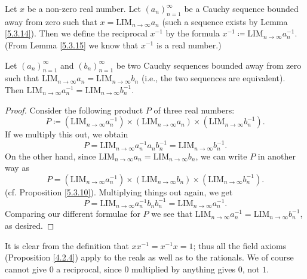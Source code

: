 \begin{definition}\label{5.3.16}
    Let \(x\) be a non-zero real number.
    Let \((a_n)_{n = 1}^{\infty}\) be a Cauchy sequence bounded away from zero such that \(x = \text{LIM}_{n \to \infty} a_n\) (such a sequence exists by Lemma \ref{5.3.14}).
    Then we define the reciprocal \(x^{-1}\) by the formula \(x^{-1} \coloneqq \text{LIM}_{n \to \infty} a_n^{-1}\).
    (From Lemma \ref{5.3.15} we know that \(x^{-1}\) is a real number.)
\end{definition}

\begin{lemma}\label{5.3.17}
    Let \((a_n)_{n = 1}^{\infty}\) and \((b_n)_{n = 1}^{\infty}\) be two Cauchy sequences bounded away from zero such that \(\text{LIM}_{n \to \infty} a_n = \text{LIM}_{n \to \infty} b_n\) (i.e., the two sequences are equivalent).
    Then \(\text{LIM}_{n \to \infty} a_n^{-1} = \text{LIM}_{n \to \infty} b_n^{-1}\).
\end{lemma}

\begin{proof}
    Consider the following product \(P\) of three real numbers:
    \[
        P \coloneqq (\text{LIM}_{n \to \infty} a_n^{-1}) \times (\text{LIM}_{n \to \infty} a_n) \times (\text{LIM}_{n \to \infty} b_n^{-1}).
    \]
    If we multiply this out, we obtain
    \[
        P = \text{LIM}_{n \to \infty} a_n^{-1} a_n b_n^{-1} = \text{LIM}_{n \to \infty} b_n^{-1}.
    \]
    On the other hand, since \(\text{LIM}_{n \to \infty} a_n = \text{LIM}_{n \to \infty} b_n\), we can write \(P\) in another way as
    \[
        P = (\text{LIM}_{n \to \infty} a_n^{-1}) \times (\text{LIM}_{n \to \infty} b_n) \times (\text{LIM}_{n \to \infty} b_n^{-1}).
    \]
    (cf. Proposition \ref{5.3.10}).
    Multiplying things out again, we get
    \[
        P = \text{LIM}_{n \to \infty} a_n^{-1} b_n b_n^{-1} = \text{LIM}_{n \to \infty} a_n^{-1}.
    \]
    Comparing our different formulae for \(P\) we see that \(\text{LIM}_{n \to \infty} a_n^{-1} = \text{LIM}_{n \to \infty} b_n^{-1}\), as desired.
\end{proof}

\begin{note}
    It is clear from the definition that \(xx^{-1} = x^{-1}x = 1\);
    thus all the field axioms (Proposition \ref{4.2.4}) apply to the reals as well as to the rationals.
    We of course cannot give \(0\) a reciprocal, since \(0\) multiplied by anything gives \(0\), not \(1\).
\end{note}

